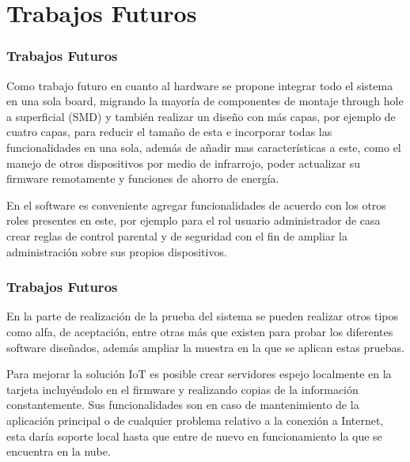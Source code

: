 \section{Trabajos Futuros}
\begin{frame}[t]
\frametitle{Trabajos Futuros}

Como trabajo futuro en cuanto al hardware se propone integrar todo el sistema en una sola board, migrando la mayoría de componentes de montaje through hole a superficial (SMD) y también realizar un diseño con más capas, por ejemplo de cuatro capas, para reducir el tamaño de esta e incorporar todas las funcionalidades en una sola, además de añadir mas características a este, como el manejo de otros dispositivos por medio de infrarrojo, poder actualizar su firmware remotamente y funciones de ahorro de energía.\newline

En el software es conveniente agregar funcionalidades de acuerdo con los otros roles presentes en este, por ejemplo para el rol usuario administrador de casa crear reglas de control parental y de seguridad con el fin de ampliar la administración sobre sus propios dispositivos.\\

\end{frame}

\begin{frame}[t]
\frametitle{Trabajos Futuros}

En la parte de realización de la prueba del sistema se pueden realizar otros tipos como alfa, de aceptación, entre otras más que existen para probar los diferentes software diseñados, además ampliar la muestra en la que se aplican estas pruebas.\newline

Para mejorar la solución IoT es posible crear servidores espejo localmente en la tarjeta incluyéndolo en el firmware y realizando copias de la información constantemente. Sus funcionalidades son en caso de mantenimiento de la aplicación principal o de cualquier problema relativo a la conexión a Internet, esta daría soporte local hasta que entre de nuevo en funcionamiento la que se encuentra en la nube.\\
\end{frame}